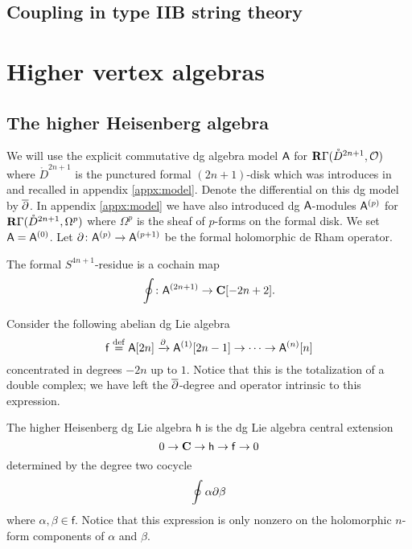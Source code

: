 \documentclass[11pt]{amsart}
\begin{document}
\subsection{Coupling in type IIB string theory}

\section{Higher vertex algebras}

\subsection{The higher Heisenberg algebra}

We will use the explicit commutative dg algebra model $\mathsf A$ for $\mathbf{R} \Gamma(\mathring{D}^{2n+1}, \mathcal O)$ where $\mathring{D}^{2n+1}$ is the punctured formal $(2n+1)$-disk which was introduces in \cite{FHK} and recalled in appendix \ref{appx:model}.
Denote the differential on this dg model by $\overline{\partial}$.
In appendix \ref{appx:model} we have also introduced dg $\mathsf A$-modules $\mathsf A^{(p)}$ for $\mathbf{R} \Gamma(\mathring{D}^{2n+1}, \Omega^{p})$ where $\Omega^{p}$ is the sheaf of $p$-forms on the formal disk.
We set $\mathsf A = \mathsf A^{(0)}$.
Let $\partial \colon \mathsf A^{(p)} \to \mathsf A^{(p+1)}$ be the formal holomorphic de Rham operator.

The formal $S^{4n+1}$-residue is a cochain map
\begin{equation}\label{eqn:residue}
  \oint \colon \mathsf A^{(2n+1)} \to \mathbf{C}[-2n+2] .
\end{equation}


Consider the following abelian dg Lie algebra
\begin{equation}\label{eqn:f}
\mathsf{f} \overset{\rm def}{=} \mathsf A[2n] \xrightarrow{\partial} \mathsf A^{(1)} [2n-1] \to \cdots \to \mathsf A^{(n)}[n]
\end{equation}
concentrated in degrees $-2n$ up to $1$.
Notice that this is the totalization of a double complex; we have left the $\overline{\partial}$-degree and operator intrinsic to this expression.

The higher Heisenberg dg Lie algebra $\mathsf{h}$ is the dg Lie algebra central extension
\begin{equation}\label{eqn:higherheis}
0 \to \mathbf{C} \to \mathsf{h} \to \mathsf{f} \to 0
\end{equation}
determined by the degree two cocycle
\begin{equation}\label{eqn:cocycleheis}
\oint \alpha \partial \beta
\end{equation}
where $\alpha, \beta \in \mathsf{f}$.
Notice that this expression is only nonzero on the holomorphic $n$-form components of $\alpha$ and $\beta$.
\end{document}
